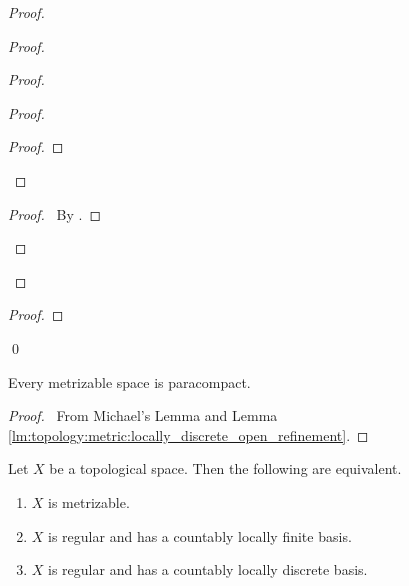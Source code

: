 \begin{proof}
\begin{proof}
\begin{proof}
\begin{proof}
\begin{proof}
      \end{proof}
    \end{proof}
    \qedstep
    \begin{proof}
      \pf\ By .
    \end{proof}
  \end{proof}
\end{proof}
\begin{proof}
\end{proof}
\qed
\end{proof}

\begin{thm}
Every metrizable space is paracompact.
\end{thm}

\begin{proof}
\pf\ From Michael's Lemma and Lemma \ref{lm:topology:metric:locally_discrete_open_refinement}.
\end{proof}

\begin{thm}
Let $X$ be a topological space. Then the following are equivalent.
\begin{enumerate}
  \item $X$ is metrizable.
  \item $X$ is regular and has a countably locally finite basis.
  \item $X$ is regular and has a countably locally discrete basis.
\end{enumerate}
\end{thm}


